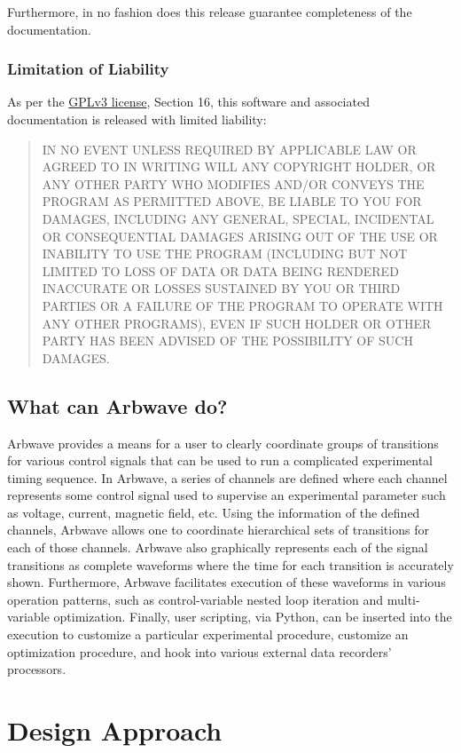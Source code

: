 Furthermore, in no fashion does this release guarantee completeness of the
documentation.

\subsubsection{Limitation of Liability}
As per the \href{https://www.gnu.org/licenses/gpl-3.0.en.html}{GPLv3 license},
Section 16, this software and associated documentation is released with limited
liability\cite{gplv3}:
\begin{quote}
IN NO EVENT UNLESS REQUIRED BY APPLICABLE LAW OR AGREED TO IN WRITING WILL ANY
COPYRIGHT HOLDER, OR ANY OTHER PARTY WHO MODIFIES AND/OR CONVEYS THE PROGRAM AS
PERMITTED ABOVE, BE LIABLE TO YOU FOR DAMAGES, INCLUDING ANY GENERAL, SPECIAL,
INCIDENTAL OR CONSEQUENTIAL DAMAGES ARISING OUT OF THE USE OR INABILITY TO USE
THE PROGRAM (INCLUDING BUT NOT LIMITED TO LOSS OF DATA OR DATA BEING RENDERED
INACCURATE OR LOSSES SUSTAINED BY YOU OR THIRD PARTIES OR A FAILURE OF THE
PROGRAM TO OPERATE WITH ANY OTHER PROGRAMS), EVEN IF SUCH HOLDER OR OTHER PARTY
HAS BEEN ADVISED OF THE POSSIBILITY OF SUCH DAMAGES.
\end{quote}


\subsection{What can Arbwave do?}
Arbwave provides a means for a user to clearly coordinate groups of transitions
for various control signals that can be used to run a complicated experimental
timing sequence.  In Arbwave, a series of channels are defined where each
channel represents some control signal used to supervise an experimental
parameter such as voltage, current, magnetic field, etc.  Using the
information of the defined channels, Arbwave allows one to coordinate
hierarchical sets of transitions for each of those channels.  Arbwave also
graphically represents each of the signal transitions as complete waveforms
where the time for each transition is accurately shown.  Furthermore, Arbwave
facilitates execution of these waveforms in various operation patterns, such
as control-variable nested loop iteration and multi-variable optimization.
Finally, user scripting, via Python, can be inserted into the execution to
customize a particular experimental procedure, customize an optimization
procedure, and hook into various external data recorders' processors.


\section{Design Approach}


